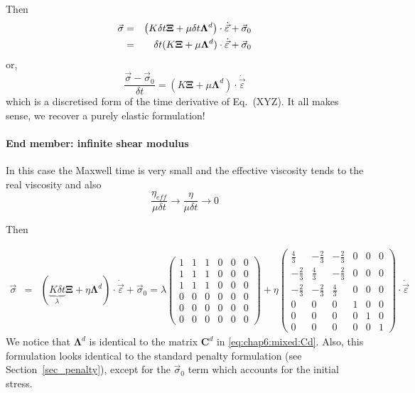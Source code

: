 Then
\begin{eqnarray}
\vec{\sigma}
&=&
\left(
K \delta t {\bm \Xi}
+
\mu \delta t {\bm \Lambda}^d
\right)
\cdot
\dot{\vec{\varepsilon}}
+
\vec{\sigma}_0 \nonumber\\
&=& 
\delta t (K  {\bm \Xi}
+ \mu  {\bm \Lambda}^d) \cdot 
\dot{\vec{\varepsilon}}
+
\vec{\sigma}_0 
\end{eqnarray}
or,
\[
\frac{\vec\sigma - \vec\sigma_0}{\delta t}
=(
K  {\bm \Xi}
+ \mu  {\bm \Lambda}^d)
\cdot \dot{\vec{\varepsilon}}
\]
which is a discretised form of the time derivative of Eq.~(XYZ). It all makes sense, we recover a purely 
elastic formulation!


\paragraph{End member: infinite shear modulus}
In this case the Maxwell time is very small and the effective
viscosity tends to the real viscosity and also  
\[
\frac{\eta_{eff}}{\mu \delta t} 
\rightarrow 
\frac{\eta}{\mu \delta t} 
\rightarrow 0
\]

Then

\begin{eqnarray}
\vec{\sigma}
&=&
\left(
\underbrace{K \delta t}_{\lambda} {\bm \Xi}
+
\eta {\bm \Lambda}^d
\right)
\cdot
\dot{\vec{\varepsilon}}
+
\vec{\sigma}_0 
= 
\lambda 
\left(
\begin{array}{cccccc}
1 & 1 & 1 & 0 & 0 & 0\\ 
1 & 1 & 1 & 0 & 0 & 0\\ 
1 & 1 & 1 & 0 & 0 & 0\\ 
0 & 0 & 0 & 0 & 0 & 0 \\
0 & 0 & 0 & 0 & 0 & 0 \\
0 & 0 & 0 & 0 & 0 & 0 
\end{array}
\right)
+ 
\eta 
\left(
\begin{array}{cccccc}
\frac43 & - \frac23 & - \frac23 & 0 & 0 & 0 \\
-\frac23 & \frac43 & - \frac23  & 0 & 0 & 0\\
-\frac23& - \frac23 & \frac43  & 0 & 0 & 0\\
0&0&0& 1&0 &0  \\
0&0&0&0&1 &0\\
0&0&0&0&0& 1
\end{array}
\right)
\cdot
\dot{\vec{\varepsilon}}
\end{eqnarray}
We notice that 
${\bm \Lambda}^d$ is identical to the matrix ${\bm C}^d$ in \eqref{eq:chap6:mixed:Cd}.
Also, this formulation looks identical to the standard penalty formulation 
(see Section~\ref{sec_penalty}), except for 
the $\vec{\sigma}_0$ term which accounts for the initial stress.

